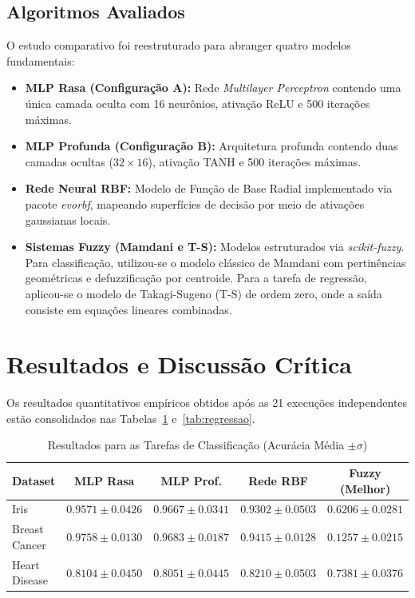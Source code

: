 \documentclass[10pt, journal, compsoc]{IEEEtran}
\begin{document}
\subsection{Algoritmos Avaliados}
O estudo comparativo foi reestruturado para abranger quatro modelos fundamentais:
\begin{itemize}
    \item \textbf{MLP Rasa (Configuração A):} Rede \textit{Multilayer Perceptron} contendo uma única camada oculta com 16 neurônios, ativação ReLU e 500 iterações máximas.
    \item \textbf{MLP Profunda (Configuração B):} Arquitetura profunda contendo duas camadas ocultas ($32 \times 16$), ativação TANH e 500 iterações máximas.
    \item \textbf{Rede Neural RBF:} Modelo de Função de Base Radial implementado via pacote \textit{evorbf}, mapeando superfícies de decisão por meio de ativações gaussianas locais.
    \item \textbf{Sistemas Fuzzy (Mamdani e T-S):} Modelos estruturados via \textit{scikit-fuzzy}. Para classificação, utilizou-se o modelo clássico de Mamdani com pertinências geométricas e defuzzificação por centroide. Para a tarefa de regressão, aplicou-se o modelo de Takagi-Sugeno (T-S) de ordem zero, onde a saída consiste em equações lineares combinadas.
\end{itemize}

\section{Resultados e Discussão Crítica}
Os resultados quantitativos empíricos obtidos após as 21 execuções independentes estão consolidados nas Tabelas~\ref{tab:classificacao} e~\ref{tab:regressao}.

\begin{table}[htbp]
\caption{Resultados para as Tarefas de Classificação (Acurácia Média $\pm \sigma$)}
\label{tab:classificacao}
\centering
\begin{tabular}{lcccc}
\toprule
\textbf{Dataset} & \textbf{MLP Rasa} & \textbf{MLP Prof.} & \textbf{Rede RBF} & \textbf{Fuzzy (Melhor)} \\
\midrule
Iris & $0.9571 \pm 0.0426$ & $\mathbf{0.9667 \pm 0.0341}$ & $0.9302 \pm 0.0503$ & $0.6206 \pm 0.0281$ \\
Breast Cancer & $\mathbf{0.9758 \pm 0.0130}$ & $0.9683 \pm 0.0187$ & $0.9415 \pm 0.0128$ & $0.1257 \pm 0.0215$ \\
Heart Disease & $0.8104 \pm 0.0450$ & $0.8051 \pm 0.0445$ & $\mathbf{0.8210 \pm 0.0503}$ & $0.7381 \pm 0.0376$ \\
\bottomrule
\end{tabular}
\end{table}
\end{document}
